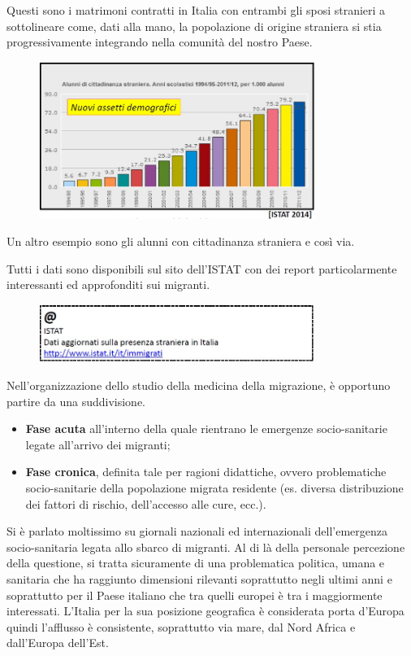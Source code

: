 Questi sono i matrimoni contratti in Italia con entrambi gli sposi
stranieri a sottolineare come, dati alla mano, la popolazione di origine
straniera si stia progressivamente integrando nella comunità del nostro
Paese.

\begin{figure}[!ht]
\centering
	\includegraphics[width=0.8\textwidth]{26/image14.jpeg}
	\end{figure}

Un altro esempio sono gli alunni con cittadinanza straniera e così via.

Tutti i dati sono disponibili sul sito dell'ISTAT con dei report
particolarmente interessanti ed approfonditi sui migranti.

\begin{figure}[!ht]
\centering
	\includegraphics[width=0.8\textwidth]{26/image15.jpeg}
	\end{figure}

Nell'organizzazione dello studio della medicina della migrazione, è
opportuno partire da una suddivisione.

\begin{itemize}
\item
  \textbf{Fase acuta} all'interno della quale rientrano le emergenze
  socio-sanitarie legate all'arrivo dei migranti;
\item
  \textbf{Fase cronica}, definita tale per ragioni didattiche, ovvero
  problematiche socio-sanitarie della popolazione migrata residente (es.
  diversa distribuzione dei fattori di rischio, dell'accesso alle cure,
  ecc.).
\end{itemize}

Si è parlato moltissimo su giornali nazionali ed internazionali
dell'emergenza socio-sanitaria legata allo sbarco di migranti. Al di là
della personale percezione della questione, si tratta sicuramente di una
problematica politica, umana e sanitaria che ha raggiunto dimensioni
rilevanti soprattutto negli ultimi anni e soprattutto per il Paese
italiano che tra quelli europei è tra i maggiormente interessati.
L'Italia per la sua posizione geografica è considerata porta d'Europa
quindi l'afflusso è consistente, soprattutto via mare, dal Nord Africa e
dall'Europa dell'Est.

